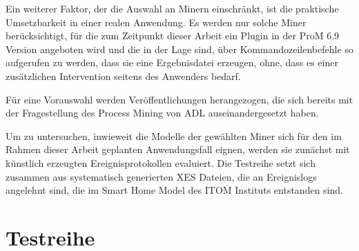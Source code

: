 Ein weiterer Faktor, der die Auswahl an Minern einschränkt, ist die praktische Umsetzbarkeit in einer realen Anwendung. Es werden nur solche Miner berücksichtigt, für die zum Zeitpunkt dieser Arbeit ein Plugin in der ProM 6.9 Version angeboten wird und die in der Lage sind, über Kommandozeilenbefehle so aufgerufen zu werden, dass sie eine Ergebnisdatei erzeugen, ohne, dass es einer zusätzlichen Intervention seitens des Anwenders bedarf.

Für eine Vorauswahl werden Veröffentlichungen herangezogen, die sich bereits mit der Fragestellung des Process Mining von ADL auseinandergesetzt haben.

\begin{table}[!h]
\centering
{}
\caption{Vergleich von Process Mining Verfahren hinsichtlich ihrer Eignung für den Einsatz im Smart Home}
\label{tab:my-table}
\end{table}

Um zu untersuchen, inwieweit die Modelle der gewählten Miner sich für den im Rahmen dieser Arbeit geplanten Anwendungsfall eignen, werden sie zunächst mit künstlich erzeugten Ereignisprotokollen evaluiert. Die Testreihe setzt sich zusammen aus systematisch generierten XES Dateien, die an Ereignislogs angelehnt sind, die im Smart Home Model des ITOM Instituts entstanden sind.


\clearpage
\section{Testreihe}
